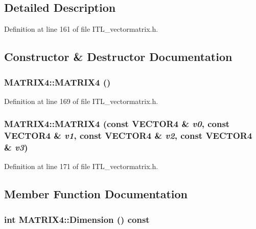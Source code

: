 \subsection{Detailed Description}


Definition at line 161 of file ITL\_\-vectormatrix.h.



\subsection{Constructor \& Destructor Documentation}
\hypertarget{classMATRIX4_adbac71e9c60831aec2a35c43e1af6ca1}{
\subsubsection[{MATRIX4}]{\setlength{\rightskip}{0pt plus 5cm}MATRIX4::MATRIX4 ()}}
\label{classMATRIX4_adbac71e9c60831aec2a35c43e1af6ca1}


Definition at line 169 of file ITL\_\-vectormatrix.h.

\hypertarget{classMATRIX4_a5d47eec9650ec2cbb6ba3f347e63b3a9}{
\subsubsection[{MATRIX4}]{\setlength{\rightskip}{0pt plus 5cm}MATRIX4::MATRIX4 (const {\bf VECTOR4} \& {\em v0}, \/  const {\bf VECTOR4} \& {\em v1}, \/  const {\bf VECTOR4} \& {\em v2}, \/  const {\bf VECTOR4} \& {\em v3})}}
\label{classMATRIX4_a5d47eec9650ec2cbb6ba3f347e63b3a9}


Definition at line 171 of file ITL\_\-vectormatrix.h.



\subsection{Member Function Documentation}
\hypertarget{classMATRIX4_af2d9ab8c4cfa8ccd705af3e0f2dd122d}{
\subsubsection[{Dimension}]{\setlength{\rightskip}{0pt plus 5cm}int MATRIX4::Dimension () const}}
\label{classMATRIX4_af2d9ab8c4cfa8ccd705af3e0f2dd122d}


